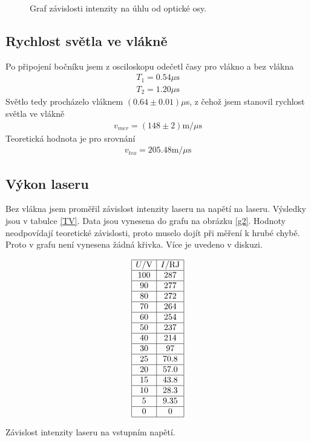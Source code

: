 \documentclass[a4paper,12pt]{article}
\begin{document}
\begin{figure}

\caption{Graf závislosti intenzity na úhlu od optické osy.}
\label{g1}
\end{figure}


\subsection{Rychlost světla ve vlákně}
Po připojení bočníku jsem z osciloskopu odečetl časy pro vlákno a bez vlákna
\begin{eqnarray}
T_1=0.54\mu\mbox{s} \\
T_2=1.20\mu\mbox{s}
\end{eqnarray}
Světlo tedy procházelo vláknem $(0.64 \pm 0.01) \mu$s, 
z čehož jsem stanovil rychlost světla ve vlákně
\begin{eqnarray}
v_{mer}=(148\pm 2) \mbox{m}/\mu\mbox{s}
\end{eqnarray}
Teoretická hodnota je pro srovnání
\begin{eqnarray}
v_{teo}=205.48\mbox{m}/\mu\mbox{s}
\end{eqnarray}

\subsection{Výkon laseru}
Bez vlákna jsem proměřil závislost intenzity laseru na napětí na laseru. Výsledky jsou 
v tabulce \ref{TV}. Data jsou vynesena do grafu na obrázku \ref{g2}. Hodnoty neodpovídají 
teoretické závislosti, proto muselo dojít při měření k hrubé chybě. Proto v grafu není 
vynesena žádná křivka. Více je uvedeno v diskuzi.

\begin{table}
$$
\begin{array}{|c|c|}
\hline
U/\mbox{V}& I/\mbox{RJ} \\ \hline
100&    287 \\ \hline
90& 277 \\ \hline
80& 272 \\ \hline
70& 264 \\ \hline
60& 254 \\ \hline
50& 237 \\ \hline
40& 214 \\ \hline
30& 97 \\ \hline
25& 70.8 \\ \hline
20& 57.0 \\ \hline
15& 43.8 \\ \hline
10& 28.3 \\ \hline
5&  9.35 \\ \hline
0&  0 \\ \hline
\end{array}
$$
\caption{Závislost intenzity laseru na vstupním napětí.}
\label{TV}
\end{table}
\end{document}
